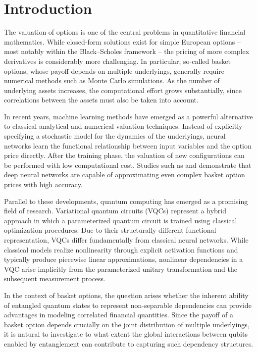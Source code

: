 \chapter{Introduction}

The valuation of options is one of the central problems in quantitative financial mathematics. While closed-form solutions exist for simple European options -- most notably within the Black--Scholes framework -- the pricing of more complex derivatives is considerably more challenging. In particular, so-called basket options, whose payoff depends on multiple underlyings, generally require numerical methods such as Monte Carlo simulations. As the number of underlying assets increases, the computational effort grows substantially, since correlations between the assets must also be taken into account.

In recent years, machine learning methods have emerged as a powerful alternative to classical analytical and numerical valuation techniques. Instead of explicitly specifying a stochastic model for the dynamics of the underlyings, neural networks learn the functional relationship between input variables and the option price directly. After the training phase, the valuation of new configurations can be performed with low computational cost. Studies such as \cite{culkin2017machine} and \cite{ferguson2018deeply} demonstrate that deep neural networks are capable of approximating even complex basket option prices with high accuracy.

Parallel to these developments, quantum computing has emerged as a promising field of research. Variational quantum circuits (VQCs) represent a hybrid approach in which a parameterized quantum circuit is trained using classical optimization procedures. Due to their structurally different functional representation, VQCs differ fundamentally from classical neural networks. While classical models realize nonlinearity through explicit activation functions and typically produce piecewise linear approximations, nonlinear dependencies in a VQC arise implicitly from the parameterized unitary transformation and the subsequent measurement process.

In the context of basket options, the question arises whether the inherent ability of entangled quantum states to represent non-separable dependencies can provide advantages in modeling correlated financial quantities. Since the payoff of a basket option depends crucially on the joint distribution of multiple underlyings, it is natural to investigate to what extent the global interactions between qubits enabled by entanglement can contribute to capturing such dependency structures.

